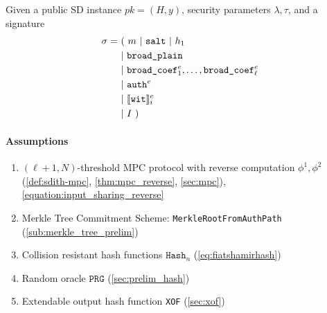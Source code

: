 \documentclass[11pt]{report}
\theoremstyle{definition}
\theoremstyle{plain}
\begin{document}
\begin{protocol}\label{def:sdith-verify}
  \setlength{\parindent}{0pt}
  \setlength{\parskip}{5pt}
  \titlespacing*{\paragraph}{0pt}{1pt}{1em}
  Given a public SD instance $pk = (H, y)$, security parameters $\lambda, \tau$, and a signature
  \begin{align*}
    \sigma = & \ (\ m\ |\ \texttt{salt}\ |\ h_1                                  \\
             & \ |\ \texttt{broad\_plain}                                        \\
             & \ |\ \texttt{broad\_coef}^e_1, \dots, \texttt{broad\_coef}^e_\ell \\
             & \ |\ \texttt{auth}^e                                              \\
             & \ |\ \sh{\texttt{wit}}_i^e                                        \\
             & \ |\ I\ )
  \end{align*}

  \paragraph{Assumptions}
  \begin{enumerate}[itemsep=0pt, topsep=0pt, parsep=0pt]
    \item $(\ell + 1, N)$-threshold MPC protocol with reverse computation $\phi^1, \phi^2$ (\autoref{def:sdith-mpc}, \autoref{thm:mpc_reverse}, \autoref{sec:mpc}), \autoref{equation:input_sharing_reverse}
    \item Merkle Tree Commitment Scheme: \texttt{MerkleRootFromAuthPath} (\autoref{sub:merkle_tree_prelim})
    \item Collision resistant  hash functions $\texttt{Hash}_n$ (\autoref{eq:fiatshamirhash})
    \item Random oracle $\texttt{PRG}$ (\autoref{sec:prelim_hash})
    \item Extendable output hash function \texttt{XOF} (\autoref{sec:xof})
  \end{enumerate}


\end{protocol}
\end{document}
